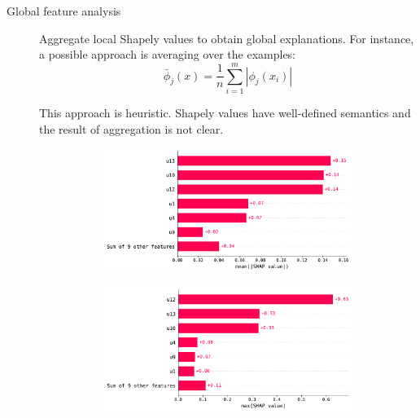 \begin{description}
        \begin{description}
            \item[Global feature analysis]
                Aggregate local Shapely values to obtain global explanations. For instance, a possible approach is averaging over the examples:
                \[ \bar{\phi}_j(x) = \frac{1}{n} \sum_{i=1}^{m} | \phi_j(x_i) | \]

                \begin{remark}
                    This approach is heuristic. Shapely values have well-defined semantics and the result of aggregation is not clear.
                \end{remark}

                \begin{figure}[H]
                    \centering
                    \begin{subfigure}{0.48\linewidth}
                        \centering
                        \includegraphics[width=\linewidth]{./img/_biomed_shap_aggr_avg.pdf}
                    \end{subfigure}
                    \begin{subfigure}{0.48\linewidth}
                        \centering
                        \includegraphics[width=\linewidth]{./img/_biomed_shap_aggr_max.pdf}
                    \end{subfigure}
                \end{figure}
        \end{description}
\end{description}


